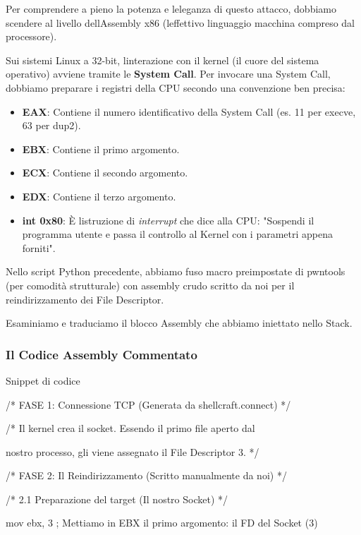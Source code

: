 \documentclass[11pt,a4paper]{article}
\begin{document}
Per comprendere a pieno la potenza e l\textquotesingle eleganza di
questo attacco, dobbiamo scendere al livello
dell\textquotesingle Assembly x86 (l\textquotesingle effettivo
linguaggio macchina compreso dal processore).

Sui sistemi Linux a 32-bit, l\textquotesingle interazione con il kernel
(il cuore del sistema operativo) avviene tramite le \textbf{System
Call}. Per invocare una System Call, dobbiamo preparare i registri della
CPU secondo una convenzione ben precisa:

\begin{itemize}
\item
  \textbf{EAX}: Contiene il numero identificativo della System Call (es.
  11 per execve, 63 per dup2).
\item
  \textbf{EBX}: Contiene il primo argomento.
\item
  \textbf{ECX}: Contiene il secondo argomento.
\item
  \textbf{EDX}: Contiene il terzo argomento.
\item
  \textbf{int 0x80}: È l\textquotesingle istruzione di \emph{interrupt}
  che dice alla CPU: "Sospendi il programma utente e passa il controllo
  al Kernel con i parametri appena forniti".
\end{itemize}

Nello script Python precedente, abbiamo fuso macro preimpostate di
pwntools (per comodità strutturale) con assembly crudo scritto da noi
per il reindirizzamento dei File Descriptor.

Esaminiamo e traduciamo il blocco Assembly che abbiamo iniettato nello
Stack.

\subsubsection{Il Codice Assembly
Commentato}\label{il-codice-assembly-commentato}

Snippet di codice

/* FASE 1: Connessione TCP (Generata da shellcraft.connect) */

/* Il kernel crea il socket. Essendo il primo file aperto dal

nostro processo, gli viene assegnato il File Descriptor 3. */

/* FASE 2: Il Reindirizzamento (Scritto manualmente da noi) */

/* 2.1 Preparazione del target (Il nostro Socket) */

mov ebx, 3 ; Mettiamo in EBX il primo argomento: il FD del Socket (3)
\end{document}
